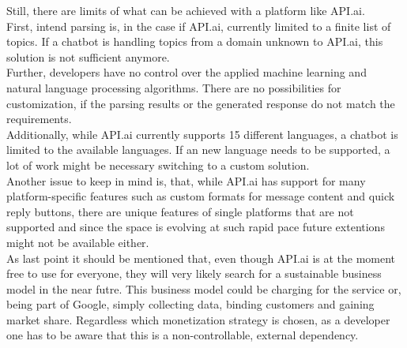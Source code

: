 Still, there are limits of what can be achieved with a platform like API.ai.
\\
First, intend parsing is, in the case if API.ai, currently limited to a finite list of topics. If a chatbot is handling topics from a domain unknown to API.ai, this solution is not sufficient anymore.
\\
Further, developers have no control over the applied machine learning and natural language processing algorithms.
There are no possibilities for customization, if the parsing results or the generated response do not match the requirements.
\\
Additionally, while API.ai currently supports 15 different languages, a chatbot is limited to the available languages.
If an new language needs to be supported, a lot of work might be necessary switching to a custom solution.
\\
Another issue to keep in mind is, that, while API.ai has support for many platform-specific features such as custom formats for message content and quick reply buttons, there are unique features of single platforms that are not supported and since the space is evolving at such rapid pace future extentions might not be available either.
\\
As last point it should be mentioned that, even though API.ai is at the moment free to use for everyone, they will very likely search for a sustainable business model in the near futre. This business model could be charging for the service or, being part of Google, simply collecting data, binding customers and gaining market share. Regardless which monetization strategy is chosen, as a developer one has to be aware that this is a non-controllable, external dependency.
